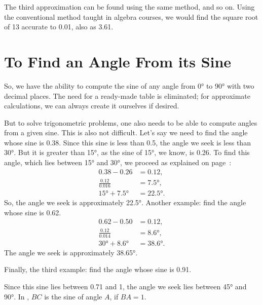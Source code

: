 The third approximation can be found using the same method, and so on. Using the conventional method taught in algebra courses, we would find the square root of 13 accurate to 0.01, also as 3.61.


\section{To Find an Angle From its Sine}
\label{sec-5.3}

So, we have the ability to compute the sine of any angle from \ang{0} to \ang{90} with two decimal places. The need for a ready-made table is eliminated; for approximate calculations, we can always create it ourselves if desired.

But to solve trigonometric problems, one also needs to be able to compute angles from a given sine. This is also not difficult. Let's say we need to find the angle whose sine is 0.38. Since this sine is less than 0.5, the angle we seek is less than \ang{30}. But it is greater than \ang{15}, as the sine of \ang{15}, we know, is 0.26. To find this angle, which lies between \ang{15} and \ang{30}, we proceed as explained on page~\pageref{page-130}:
\begin{align*}%
0.38 - 0.26 & = 0.12,\\
\frac{0.12}{0.016} & = \ang{7.5},\\
\ang{15}  + \ang{7.5} & = \ang{22.5}.
\end{align*}
So, the angle we seek is approximately \ang{22.5}. Another example: find the angle whose sine is 0.62.
\begin{align*}%
0.62 - 0.50 & = 0.12,\\
\frac{0.12}{0.014} & = \ang{8.6},\\
\ang{30}  + \ang{8.6} & = \ang{38.6}.
\end{align*}
The angle we seek is approximately \ang{38.65}.

Finally, the third example: find the angle whose sine is 0.91.

Since this sine lies between 0.71 and 1, the angle we seek lies between \ang{45} and \ang{90}. In , $BC$ is the sine of angle $A$, if $BA = 1$.

